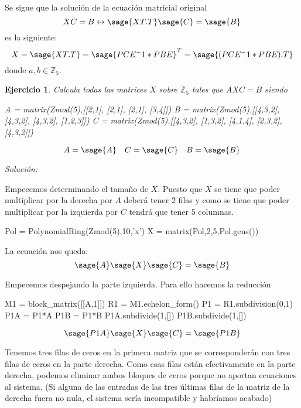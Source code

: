 \documentclass{amsart}
\newtheorem{ejer}{Ejercicio}
\begin{document}
Se sigue que la solución de la ecuación matricial original 
$$XC=B \leftrightarrow \sage{XT.T}\sage{C}=\sage{B}$$
es la siguiente:
$$ X=\sage{XT.T}={\sage{PCE^-1 * PBE}}^T=\sage{(PCE^-1 * PBE).T}$$
donde $a,b \in {\mathbb Z}_5$.


\newpage

\begin{ejer}
Calcula todas las matrices $X$ sobre ${\mathbb Z}_5$ tales que $AXC = B$ siendo

\begin{sageblock}
A =  matrix(Zmod(5),[[2,1],
[2,1],
[2,1],
[3,4]])
B =  matrix(Zmod(5),[[4,3,2],
[4,3,2],
[4,3,2],
[1,2,3]])
C =  matrix(Zmod(5),[[4,3,2],
[1,3,2],
[4,1,4],
[2,3,2],
[4,3,2]])
\end{sageblock}

$$ A = \sage{A} \quad C = \sage{C} \quad B = \sage{B} $$
\end{ejer}

{\it Solución:} 


Empecemos determinando el tamaño de $X$. Puesto que $X$ se tiene que poder
multiplicar por la derecha por $A$ deberá tener $2$ filas y como se tiene que
poder multiplicar por la izquierda por $C$ tendrá que tener $5$ columnas.

\begin{sageblock}
Pol = PolynomialRing(Zmod(5),10,'x')
X = matrix(Pol,2,5,Pol.gens())
\end{sageblock}

La ecuación nos queda:
$$ \sage{A} \sage{X} \sage{C} = \sage{B}$$

Empecemos despejando la parte izquierda. Para ello hacemos la reducción

\begin{sageblock}
M1 = block_matrix([[A,1]])
R1 = M1.echelon_form()
P1 = R1.subdivision(0,1)
P1A = P1*A
P1B = P1*B
P1A.subdivide(1,[])
P1B.subdivide(1,[])
\end{sageblock}

$$\sage{P1A} \sage{X} \sage{C} = \sage{P1B} $$

Tenemos tres filas de ceros en la primera matriz que se corresponderán con tres 
filas de ceros en la parte derecha. Como esas filas están efectivamente en la parte
derecha, podemos eliminar ambos bloques de ceros porque no aportan ecuaciones al sistema. (Si alguna de las entradas de las tres últimas filas de la matriz de la derecha fuera no nula, el sistema sería incompatible y habríamos acabado)
\end{document}
